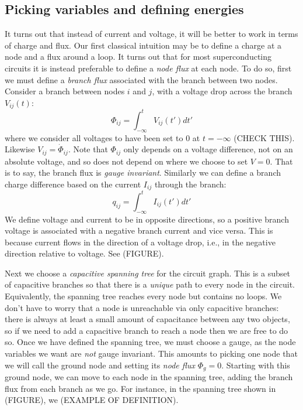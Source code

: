 \subsection{Picking variables and defining energies}
It turns out that instead of current and voltage, it will be better to work in terms of charge and flux. Our first classical intuition may be to define a charge at a node and a flux around a loop. It turns out that for most superconducting circuits it is instead preferable to define a \textit{node flux} at each node. To do so, first we must define a \textit{branch flux} associated with the branch between two nodes. Consider a branch between nodes $i$ and $j$, with a voltage drop across the branch $V_{ij}(t)$: 
\begin{equation}
    \Phi_{ij} = \int_{-\infty}^tV_{ij}(t')dt'
\end{equation}
where we consider all voltages to have been set to 0 at $t=-\infty$ (CHECK THIS). Likewise $V_{ij} = \dot{\Phi}_{ij}$. Note that $\Phi_{ij}$ only depends on a voltage difference, not on an absolute voltage, and so does not depend on where we choose to set $V=0$. That is to say, the branch flux is \textit{gauge invariant}. Similarly we can define a branch charge difference based on the current $I_{ij}$ through the branch:
\begin{equation}
    q_{ij} = \int_{-\infty}^tI_{ij}(t')dt'
\end{equation}
We define voltage and current to be in opposite directions, so a positive branch voltage is associated with a negative branch current and vice versa. This is because current flows in the direction of a voltage drop, i.e., in the negative direction relative to voltage. See (FIGURE). 

Next we choose a \textit{capacitive spanning tree} for the circuit graph. This is a subset of capacitive branches so that there is a \textit{unique} path to every node in the circuit. Equivalently, the spanning tree reaches every node but contains no loops. We don't have to worry that a node is unreachable via only capacitive branches: there is always at least a small amount of capacitance between any two objects, so if we need to add a capacitive branch to reach a node then we are free to do so. Once we have defined the spanning tree, we must choose a gauge, as the node variables we want are \textit{not} gauge invariant. This amounts to picking one node that we will call the ground node and setting its \textit{node flux} $\Phi_g = 0$. Starting with this ground node, we can move to each node in the spanning tree, adding the branch flux from each branch as we go. For instance, in the spanning tree shown in (FIGURE), we (EXAMPLE OF DEFINITION).



